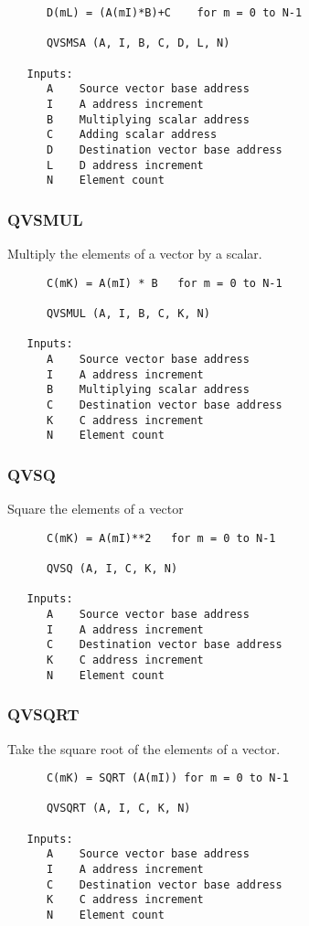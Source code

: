 \begin{verbatim}
      D(mL) = (A(mI)*B)+C    for m = 0 to N-1

      QVSMSA (A, I, B, C, D, L, N)

   Inputs:
      A    Source vector base address
      I    A address increment
      B    Multiplying scalar address
      C    Adding scalar address
      D    Destination vector base address
      L    D address increment
      N    Element count

\end{verbatim}
\subsubsection{QVSMUL }
Multiply the elements of a vector by a scalar.

\begin{verbatim}
      C(mK) = A(mI) * B   for m = 0 to N-1

      QVSMUL (A, I, B, C, K, N)

   Inputs:
      A    Source vector base address
      I    A address increment
      B    Multiplying scalar address
      C    Destination vector base address
      K    C address increment
      N    Element count

\end{verbatim}
\subsubsection{QVSQ }
Square the elements of a vector

\begin{verbatim}
      C(mK) = A(mI)**2   for m = 0 to N-1

      QVSQ (A, I, C, K, N)

   Inputs:
      A    Source vector base address
      I    A address increment
      C    Destination vector base address
      K    C address increment
      N    Element count

\end{verbatim}
\subsubsection{QVSQRT }
Take the square root of the elements of a vector.

\begin{verbatim}
      C(mK) = SQRT (A(mI)) for m = 0 to N-1

      QVSQRT (A, I, C, K, N)

   Inputs:
      A    Source vector base address
      I    A address increment
      C    Destination vector base address
      K    C address increment
      N    Element count

\end{verbatim}
